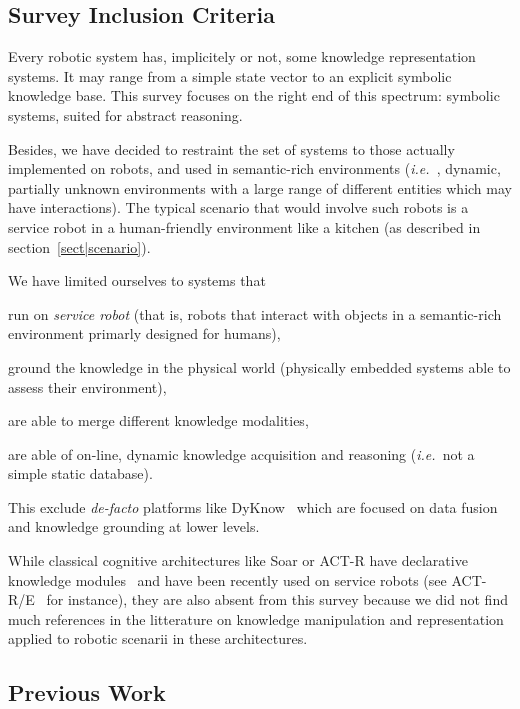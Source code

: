 \documentclass[a4paper, twocolumn]{article}
\newcommand{\ie}{{\textit{i.e.~}}}
\begin{document}
\subsection*{Survey Inclusion Criteria}
\label{sect|inclusion-criteria}

Every robotic system has, implicitely or not, some knowledge representation
systems. It may range from a simple state vector to an explicit symbolic
knowledge base.  This survey focuses on the right end of this spectrum:
symbolic systems, suited for abstract reasoning.

Besides, we have decided to restraint the set of systems to those actually
implemented on robots, and used in semantic-rich environments (\ie , dynamic,
partially unknown environments with a large range of different entities which
may have interactions). The typical scenario that would involve such robots is
a service robot in a human-friendly environment like a kitchen (as described in
section~\ref{sect|scenario}).

We have limited ourselves to systems that
\begin{inparaenum} 
    \item  run on \emph{service robot} (that is, robots that interact with 
    objects in a semantic-rich environment primarly designed for humans),
    \item  ground the knowledge in the physical world (physically embedded
    systems able to assess their environment),
    \item  are able to merge different knowledge modalities,
    \item  are able of on-line, dynamic knowledge acquisition and reasoning 
    (\ie not a simple static database).
\end{inparaenum}

This exclude \textit{de-facto} platforms like {\sc DyKnow}~\cite{Heintz2004}
which are focused on data fusion and knowledge grounding at lower levels.

While classical cognitive architectures like {\sc Soar} or {\sc ACT-R} have
declarative knowledge modules~\cite{Derbinsky2010} and have been recently used
on service robots (see {\sc ACT-R/E}~\cite{Kennedy2009} for instance), they are
also absent from this survey because we did not find much references in the
litterature on knowledge manipulation and representation applied to robotic
scenarii in these architectures.

\subsection{Previous Work}
\label{sect|evaluation-literature}
\end{document}
